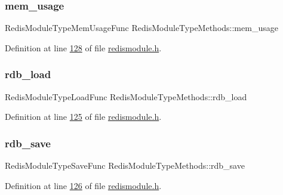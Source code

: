 \subsubsection{\texorpdfstring{mem\+\_\+usage}{mem\_usage}}
{\footnotesize\ttfamily Redis\+Module\+Type\+Mem\+Usage\+Func Redis\+Module\+Type\+Methods\+::mem\+\_\+usage}



Definition at line \hyperlink{redismodule_8h_source_l00128}{128} of file \hyperlink{redismodule_8h_source}{redismodule.\+h}.

\mbox{\label{structRedisModuleTypeMethods_a3fa03e5f9f21fb808e3116196fd9f66f}} 
\subsubsection{\texorpdfstring{rdb\+\_\+load}{rdb\_load}}
{\footnotesize\ttfamily Redis\+Module\+Type\+Load\+Func Redis\+Module\+Type\+Methods\+::rdb\+\_\+load}



Definition at line \hyperlink{redismodule_8h_source_l00125}{125} of file \hyperlink{redismodule_8h_source}{redismodule.\+h}.

\mbox{\label{structRedisModuleTypeMethods_a928c30a5f09b76b3ee9bde0a5cf639d7}} 
\subsubsection{\texorpdfstring{rdb\+\_\+save}{rdb\_save}}
{\footnotesize\ttfamily Redis\+Module\+Type\+Save\+Func Redis\+Module\+Type\+Methods\+::rdb\+\_\+save}



Definition at line \hyperlink{redismodule_8h_source_l00126}{126} of file \hyperlink{redismodule_8h_source}{redismodule.\+h}.

\mbox{\label{structRedisModuleTypeMethods_a4db2f9e662f4c899bb496edc27fa0434}} 
